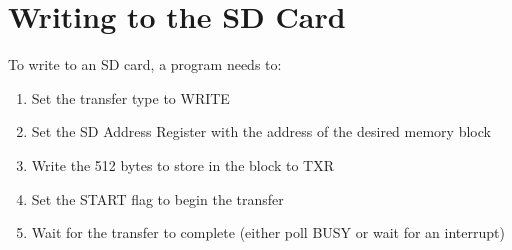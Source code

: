 \section*{Writing to the SD Card}
To write to an SD card, a program needs to:
\begin{enumerate}
    \item Set the transfer type to WRITE
    \item Set the SD Address Register with the address of the desired memory block
    \item Write the 512 bytes to store in the block to TXR
    \item Set the START flag to begin the transfer
    \item Wait for the transfer to complete (either poll BUSY or wait for an interrupt)
\end{enumerate}

